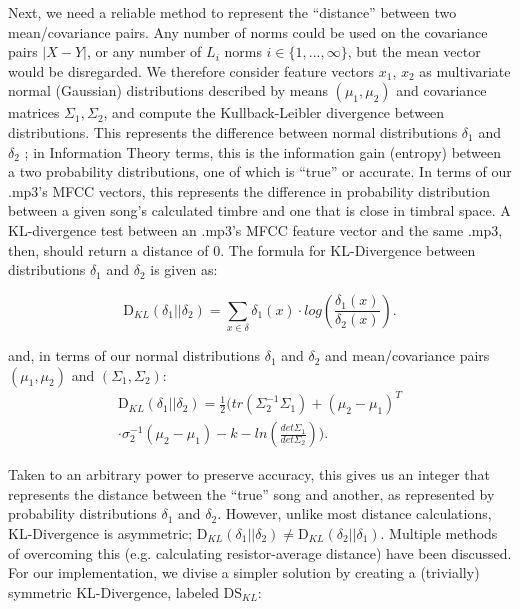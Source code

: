 \documentclass[12pt,twocolumn,titlepage]{article}
\begin{document}
Next, we need a reliable method to represent the ``distance'' between two mean/covariance pairs. Any number of norms could be used on the covariance pairs $|X - Y|$, or any number of $L_i$ norms $i \in \{1,...,\infty\}$, but the mean vector would be disregarded. We therefore consider feature vectors $x_1$, $x_2$ as multivariate normal (Gaussian) distributions described by means $(\mu_1, \mu_2)$ and covariance matrices $\Sigma_1, \Sigma_2$, and compute the Kullback-Leibler divergence between distributions. This represents the difference between normal distributions $\delta_1$ and $\delta_2$ \cite{ChiRussel-web}; in Information Theory terms, this is the information gain (entropy) between a two probability distributions, one of which is ``true'' or accurate. In terms of our .mp3's MFCC vectors, this represents the difference in probability distribution between a given song's calculated timbre and one that is close in timbral space. A KL-divergence test between an .mp3's MFCC feature vector and the same .mp3, then, should return a distance of 0. The formula for KL-Divergence between distributions $\delta_1$ and $\delta_2$ is given as:

\begin{equation}\label{}
\mathrm{D}_{KL}(\delta_1||\delta_2) = \sum_{x \in \delta}{}{\delta_1(x) \cdot log(\frac{\delta_1(x)}{\delta_2(x)})}.
\end{equation}

and, in terms of our normal distributions $\delta_1$ and $\delta_2$ and mean/covariance pairs $(\mu_1, \mu_2)$ and $(\Sigma_1, \Sigma_2)$:
\begin{multline}
\mathrm{D}_{KL}(\delta_1||\delta_2) = \frac{1}{2}\bigg(tr(\Sigma_2^{-1}\Sigma_1) + (\mu_2-\mu_1)^T \\
 \cdot \sigma_2^{-1}(\mu_2-\mu_1)-k-ln(\frac{det\Sigma_1}{det\Sigma_2})\bigg).
\end{multline}

Taken to an arbitrary power to preserve accuracy, this gives us an integer that represents the distance between the ``true'' song and another, as represented by probability distributions $\delta_1$ and $\delta_2$. However, unlike most distance calculations, KL-Divergence is asymmetric; $\mathrm{D}_{KL}(\delta_1 || \delta_2) \neq \mathrm{D}_{KL}(\delta_2 || \delta_1)$. Multiple methods of overcoming this (e.g. calculating resistor-average distance) \cite{JohnsonSinaovic} have been discussed. For our implementation, we divise a simpler solution by creating a (trivially) symmetric KL-Divergence, \cite{MaggbladeHongKao} labeled $\mathrm{DS}_{KL}$: 
\end{document}
